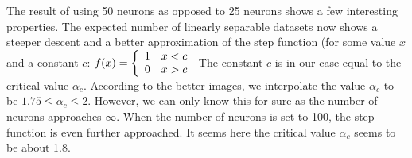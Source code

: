 The result of using 50 neurons as opposed to 25 neurons shows a few interesting properties. The expected number of linearly separable datasets now shows a steeper descent and a better approximation of the step function (for some value $x$ and a constant $c$: 
$f(x) = \left\{ 
  \begin{array}{l l}
    1 & x < c\\
    0 & x > c
  \end{array} \right.$
The constant $c$ is in our case equal to the critical value $\alpha_c$. According to the better images, we interpolate the value $\alpha_c$ to be $1.75 \leq \alpha_c \leq 2$. However, we can only know this for sure as the number of neurons approaches $\infty$.
When the number of neurons is set to 100, the step function is even further approached. It seems here the critical value $\alpha_c$ seems to be about 1.8.